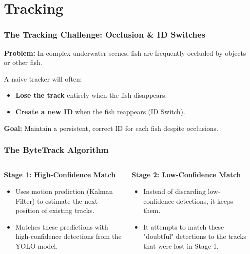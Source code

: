 \documentclass[serif]{beamer}  %
\begin{document}
\section{Tracking}

\begin{frame}
    \frametitle{The Tracking Challenge: Occlusion \& ID Switches}
    
    \textbf{Problem:} In complex underwater scenes, fish are frequently occluded by objects or other fish.
    \vspace{1em}
            
    A naive tracker will often:
    \begin{itemize}
        \item \textbf{Lose the track} entirely when the fish disappears.
        \item \textbf{Create a new ID} when the fish reappears (\textcolor{deepred}{ID Switch}).
    \end{itemize}
    
    \vspace{1em}
    \textbf{Goal:} Maintain a persistent, correct ID for each fish despite occlusions.
\end{frame}


\begin{frame}
    \frametitle{The ByteTrack Algorithm}
    
    \begin{columns}[T]
        \begin{column}{0.5\textwidth}
            \textbf{Stage 1: High-Confidence Match}
            \begin{itemize}
                \item Uses motion prediction (Kalman Filter) to estimate the next position of existing tracks.
                \item Matches these predictions with high-confidence detections from the YOLO model.
            \end{itemize}
        \end{column}
        
        \begin{column}{0.5\textwidth}
            \textbf{Stage 2: Low-Confidence Match}
            \begin{itemize}
                \item Instead of discarding low-confidence detections, it keeps them.
                \item It attempts to match these "doubtful" detections to the tracks that were lost in Stage 1.
            \end{itemize}
        \end{column}
    \end{columns}
    
\end{frame}
\end{document}
